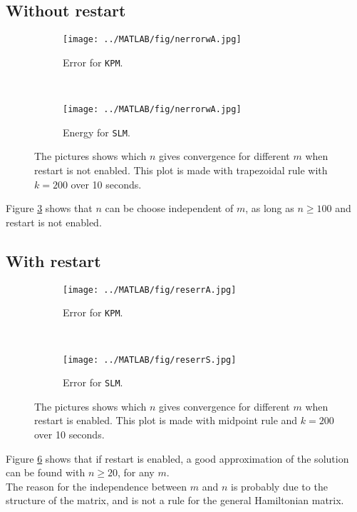\subsection{Without restart} %
\begin{figure}[H]
        \centering
        \begin{subfigure}[b]{0.45\textwidth}
                \texttt{[image: ../MATLAB/fig/nerrorwA.jpg]}
                \caption{ Error for \texttt{KPM}. }
                \label{fig:nerrorw}
        \end{subfigure}
        ~
        \begin{subfigure}[b]{0.45\textwidth}
                \texttt{[image: ../MATLAB/fig/nerrorwA.jpg]}
                \caption{ Energy for \texttt{SLM}. \\ }
                \label{fig:nenergyw}
        \end{subfigure}
        \caption{ The pictures shows which $n$ gives convergence for different $m$ when restart is not enabled. This plot is made with trapezoidal rule with $k = 200$ over 10 seconds. }
        \label{fig:n}
\end{figure}
Figure \ref{fig:n} shows that $n$ can be choose independent of $m$, as long as $n \geq 100$ and restart is not enabled.

\subsection{With restart} %

\begin{figure}[H]
        \centering
        \begin{subfigure}[b]{0.45\textwidth}
                \texttt{[image: ../MATLAB/fig/reserrA.jpg]}
                \caption{ Error for \texttt{KPM}. }
                \label{fig:reserrS}
        \end{subfigure}
		~
		\begin{subfigure}[b]{0.45\textwidth}
                \texttt{[image: ../MATLAB/fig/reserrS.jpg]}
                \caption{ Error for \texttt{SLM}. }
                \label{fig:reseneA}
        \end{subfigure}
        \caption{ The pictures shows which $n$ gives convergence for different $m$ when restart is enabled. This plot is made with midpoint rule and $k = 200$ over 10 seconds. }
        \label{fig:res}

\end{figure}
Figure \ref{fig:res} shows that if restart is enabled, a good approximation of the solution can be found with $n \geq 20$, for any $m$.\\
The reason for the independence between $m$ and $n$ is probably due to the structure of the matrix, and is not a rule for the general Hamiltonian matrix.

